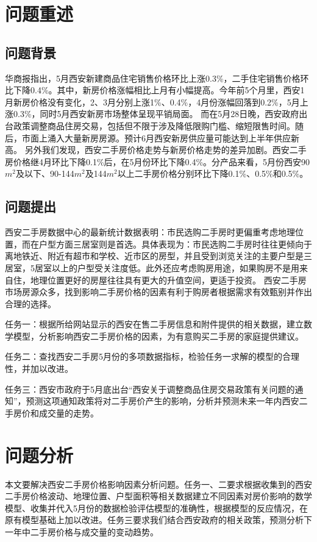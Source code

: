 \documentclass[withoutpreface,bwprint]{cumcmthesis} %
\begin{document}
\section{问题重述}
\subsection{问题背景}
华商报指出，5月西安新建商品住宅销售价格环比上涨0.3\%，二手住宅销售价格环比下降0.4\%。其中，新房价格涨幅相比上月有小幅提高。今年前5个月里，西安1月新房价格没有变化，2、3月分别上涨1\%、0.4\%，4月份涨幅回落到0.2\%，5月上涨0.3\%，同时5月西安新房市场整体呈现平销局面。
而在5月28日晚，西安政府出台政策调整商品住房交易，包括但不限于涉及降低限购门槛、缩短限售时间。随后，市面上涌入大量新房房源。预计6月西安新房供应量可能达到上半年供应新高。
另外我们发现，西安二手房价格走势与新房价格走势的差异加剧。西安二手房价格继4月环比下降0.1\%后，在5月份环比下降0.4\%。分产品来看，5月份西安90$m^2$及以下、90-144$m^2$及144$m^2$以上二手房价格分别环比下降0.1\%、0.5\%和0.5\%。
\subsection{问题提出}
西安二手房数据中心的最新统计数据表明：市民选购二手房时更偏重考虑地理位置，而在户型方面三居室则是首选。具体表现为：市民选购二手房时往往更倾向于离地铁近、附近有超市和学校、近市区的房型，并且受到浏览关注的主要户型是三居室，5居室以上的户型受关注度低。此外还应考虑购房用途，如果购房不是用来自住，地理位置更好的房屋往往具有更大的升值空间，更适于投资。
西安二手房市场房源众多，找到影响二手房价格的因素有利于购房者根据需求有效甄别并作出合理的选择。

任务一：根据所给网站显示的西安在售二手房信息和附件提供的相关数据，建立数学模型，分析影响西安二手房价格的因素，为有意购买二手房的家庭提供建议。

任务二：查找西安二手房5月份的多项数据指标，检验任务一求解的模型的合理性，并加以改进。

任务三：西安市政府于5月底出台“西安关于调整商品住房交易政策有关问题的通知”，预测这项通知政策将对二手房价产生的影响，分析并预测未来一年内西安二手房价和成交量的走势。
\section{问题分析}
本文要解决西安二手房价格影响因素分析问题。任务一、二要求根据收集到的西安二手房价格波动、地理位置、户型面积等相关数据建立不同因素对房价影响的数学模型、收集并代入5月份的数据检验评估模型的准确性，根据模型的反应情况，在原有模型基础上加以改进。任务三要求我们结合西安政府的相关政策，预测分析下一年中二手房价格与成交量的变动趋势。
\end{document}
